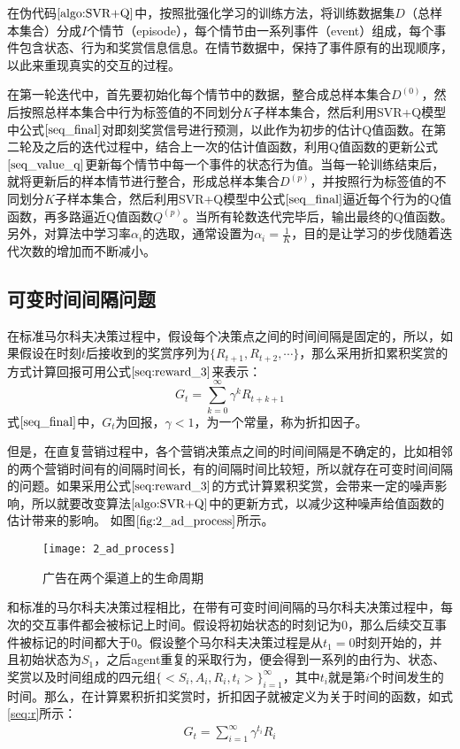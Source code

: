 在伪代码$\ref{algo:SVR+Q}$中，按照批强化学习的训练方法，将训练数据集$D$（总样本集合）分成$I$个情节（episode），每个情节由一系列事件（event）组成，每个事件包含状态、行为和奖赏信息信息。在情节数据中，保持了事件原有的出现顺序，以此来重现真实的交互的过程。

在第一轮迭代中，首先要初始化每个情节中的数据，整合成总样本集合$D^{(0)}$，然后按照总样本集合中行为标签值的不同划分$K$子样本集合，然后利用SVR+Q模型中公式$\eqref{seq_final}$对即刻奖赏信号进行预测，以此作为初步的估计Q值函数。在第二轮及之后的迭代过程中，结合上一次的估计值函数，利用Q值函数的更新公式$\eqref{seq_value_q}$更新每个情节中每一个事件的状态行为值。当每一轮训练结束后，就将更新后的样本情节进行整合，形成总样本集合$D^{(p)}$，并按照行为标签值的不同划分$K$子样本集合，然后利用SVR+Q模型中公式$\eqref{seq_final}$逼近每个行为的Q值函数，再多路逼近Q值函数$Q^{(p)}$。当所有轮数迭代完毕后，输出最终的Q值函数。另外，对算法中学习率$\alpha_{i}$的选取，通常设置为$\alpha_{i}=\frac{1}{K}$，目的是让学习的步伐随着迭代次数的增加而不断减小。

\subsection{可变时间间隔问题}
在标准马尔科夫决策过程中，假设每个决策点之间的时间间隔是固定的，所以，如果假设在时刻$t$后接收到的奖赏序列为$\{R_{t+1}, R_{t+2},\cdots\}$，那么采用折扣累积奖赏的方式计算回报可用公式$\eqref{seq:reward_3}$来表示：
\begin{equation}\label{seq:reward_3}
G_{t}=\sum_{k=0}^{\infty}\gamma^{k}R_{t+k+1}
\end{equation}
式$\eqref{seq_final}$中，$G_{t}$为回报，$\gamma<1$，为一个常量，称为折扣因子。

但是，在直复营销过程中，各个营销决策点之间的时间间隔是不确定的，比如相邻的两个营销时间有的间隔时间长，有的间隔时间比较短，所以就存在可变时间间隔的问题。如果采用公式$\eqref{seq:reward_3}$的方式计算累积奖赏，会带来一定的噪声影响，所以就要改变算法$\ref{algo:SVR+Q}$中的更新方式，以减少这种噪声给值函数的估计带来的影响。
如图$\ref{fig:2_ad_process}$所示。
\begin{figure}[htbp]
\centering
\texttt{[image: 2\_ad\_process]}
\caption{广告在两个渠道上的生命周期}
\label{fig:2_ad_process}
\end{figure}

和标准的马尔科夫决策过程相比，在带有可变时间间隔的马尔科夫决策过程中，每次的交互事件都会被标记上时间。假设将初始状态的时刻记为$0$，那么后续交互事件被标记的时间都大于0。假设整个马尔科夫决策过程是从$t_{1}=0$时刻开始的，并且初始状态为$S_{1}$，之后agent重复的采取行为，便会得到一系列的由行为、状态、奖赏以及时间组成的四元组$\{<S_{i},A_{i},R_{i},t_{i}>\}_{i=1}^{\infty}$，其中$t_{i}$就是第$i$个时间发生的时间。那么，在计算累积折扣奖赏时，折扣因子就被定义为关于时间的函数，如式\eqref{seq:r}所示：
\begin{equation}\label{seq:r}
\begin{aligned}
G_{t}=\sum_{i=1}^{\infty} \gamma^{t_{i}}R_{i}
\end{aligned}
\end{equation}

